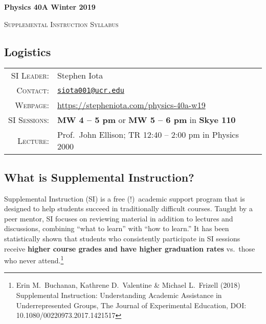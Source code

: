 \documentclass[11pt]{article}
\begin{document}
\begin{center}
\Large\textbf{{Physics 40A Winter 2019}}

\large{\textsc{Supplemental Instruction Syllabus}} 


\end{center}





\subsection*{Logistics}

\begin{tabular}{rl}

\textsc{SI Leader}:
&
Stephen Iota
\\
\textsc{Contact}:
&
\href{mailto:siota001@ucr.edu}{\texttt{siota001@ucr.edu}}
\\
\textsc{Webpage}:
&
\url{https://stepheniota.com/physics-40a-w19}
\\
\textsc{SI Sessions}:
&
\textbf{MW 4 -- 5 pm} or \textbf{MW 5 -- 6 pm} in \textbf{Skye 110}
\\
\textsc{Lecture:}
&
Prof.~John Ellison; TR 12:40 -- 2:00 pm  in Physics 2000
\\
\end{tabular}







\subsection*{What is Supplemental Instruction?}

Supplemental Instruction \textsc{(SI)} is a free (!)\ academic support program that is designed to help students succeed in traditionally difficult courses. 
Taught by a peer mentor, SI focuses on reviewing material in addition to lectures and discussions, combining ``what to learn'' with ``how to learn.''
It has been statistically shown that students who consistently participate in SI sessions receive \textbf{higher course grades and have higher graduation rates} vs.~those who never attend.\footnote{Erin M.~Buchanan, Kathrene D.~Valentine \& Michael L.~Frizell (2018) Supplemental Instruction: Understanding Academic Assistance in Underrepresented Groups, The Journal of Experimental Education, DOI: 10.1080/00220973.2017.1421517}
\end{document}
